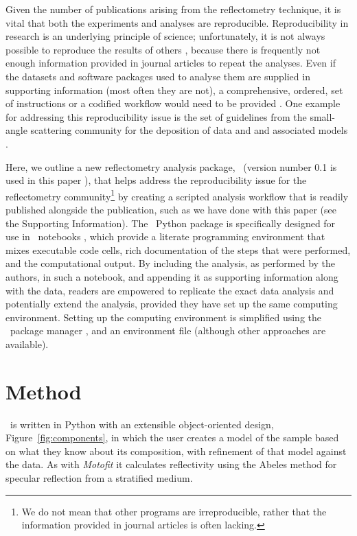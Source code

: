 \documentclass[pdf,preprint]{iucr}
\begin{document}
Given the number of publications arising from the reflectometry technique, it is vital that both the experiments and analyses are reproducible.
Reproducibility in research is an underlying principle of science; unfortunately, it is not always possible to reproduce the results of others \cite{Stark2018}, because there is frequently not enough information provided in journal articles to repeat the analyses. Even if the datasets and software packages used to analyse them are supplied in supporting information (most often they are not), a comprehensive, ordered, set of instructions or a codified workflow would need to be provided \cite{Moeller2017a}.
One example for addressing this reproducibility issue is the set of guidelines from the small-angle scattering community for the deposition of data and and associated models \cite{Trewhella:jc5010}.

Here, we outline a new reflectometry analysis package, \ (version number 0.1 is used in this paper \cite{refnx}), that helps address the reproducibility issue for the reflectometry community\footnote{We do not mean that other programs are irreproducible, rather that the information provided in journal articles is often lacking.} by creating a scripted analysis workflow that is readily published alongside the publication, such as we have done with this paper (see the Supporting Information).
The \ Python package is specifically designed for use in \Jupyter\ notebooks \cite{Kluyver:2016aa}, which provide a literate programming environment that mixes executable code cells, rich documentation of the steps that were performed, and the computational output. By including the analysis, as performed by the authors, in such a notebook, and appending it as supporting information along with the data, readers are empowered to replicate the exact data analysis and potentially extend the analysis, provided they have set up the same computing environment. Setting up the computing environment is simplified using the \conda\ package manager \cite{conda}, and an environment file (although other approaches are available).
\section{Method}

\ is written in Python with an extensible object-oriented design, Figure~\ref{fig:components}, in which the user creates a model of the sample based on what they know about its composition, with refinement of that model against the data. As with \emph{Motofit} \cite{Nelson2006} it calculates reflectivity using the Abeles method \cite{Heavens1955} for specular reflection from a stratified medium.
\end{document}

